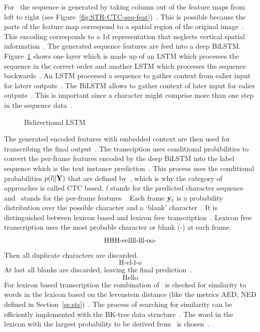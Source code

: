 For~\cite{shi_end--end_2017} the sequence is generated by taking column out of the feature maps
from left to right (see Figure~\ref{fig:STR-CTC-seq-feat})~\citep{shi_end--end_2017}.
This is possible because the parts of the feature map correspond to a spatial region of the
original image~\citep{shi_end--end_2017,goodfellow_deep_2016}.
This encoding corresponds to a 1d representation that neglects vertical spatial
information~\citep{cong_comparative_2019}.
The generated sequence features are feed into a deep \ac{BiLSTM}.
Figure~\ref{fig:bilstm} shows one layer which is made up of an \ac{LSTM} which processes the
sequence in the correct order and another \ac{LSTM} which processes the sequence
backwards~\citep{shi_end--end_2017}.
An \ac{LSTM} processed a sequence to gather context from ealier input for laterr
outputs~\citep{shi_end--end_2017,goodfellow_deep_2016}.
The \ac{BiLSTM} allows to gather context of later input for ealier outputs~\citep{shi_end--end_2017}.
This is important since a character might comprise more than one step in the sequence
data~\citep{shi_end--end_2017}.
\begin{figure}[ht]
    \centering
    \caption[Bidirectional LSTM]{%
        Bidirectional LSTM~\citep{goodfellow_deep_2016}\label{fig:bilstm}
    }
\end{figure}
The generated encoded features with embedded context are then used for transcribing the final
output~\citep{shi_end--end_2017}.
The transciption uses conditional probibilities to convert the per-frame features encoded by the
deep \ac{BiLSTM} into the label sequence which is the text instance
prediction~\citep{shi_end--end_2017}.
This process uses the conditional probabilities $p(l\|\textbf{Y})$ that are defined
by~\cite{graves_connectionist_2006}, which is why the category of approaches is called
\ac{CTC} based.
$l$ stands for the predicted character sequence and \Y\ stands for the per-frame
features~\citep{shi_end--end_2017}.
Each frame $\textbf{y}_t$ is a probability distribution over the possible character and a `blank'
character~\citep{shi_end--end_2017,graves_connectionist_2006}.
It is distinguished between lexicon based and lexicon free transcription~\citep{shi_end--end_2017}.
Lexicon free transcription uses the most probable character or blank (-) at each frame.
\[\text{HHH-eellll-lll-\-oo-\-\-}\]
Then all duplicate characters are discarded.
\[\text{H-el-l-o}\]
At last all blanks are discarded, leaving the final prediction~\citep{shi_end--end_2017}.
\[\text{Hello}\]
For lexicon based transcription the combination of \Y\ is checked for similarity to words in the
lexicon based on the levenstein distance (like the metrics \ac{AED}, \ac{NED} defined in
Section~\ref{se:sts})~\citep{shi_end--end_2017}.
The process of searching for similarity can be efficiently implemented with the BK-tree data
structure~\citep{burkhard_approaches_1973,shi_end--end_2017}.
The word in the lexicon with the largest probability to be derived from \Y\ is
chosen~\citep{shi_end--end_2017}.

